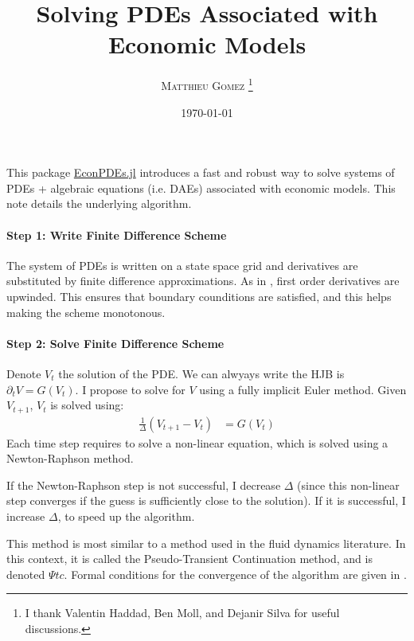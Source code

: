 \documentclass[english]{article}
\begin{document}
	\title{Solving PDEs Associated with Economic Models}
	\author{\large{\textsc{Matthieu Gomez \thanks{I thank Valentin Haddad, Ben Moll, and Dejanir Silva for useful discussions.}}}}
	\date{\today}
	\maketitle
	This package \href{https://github.com/matthieugomez/EconPDEs.jl}{EconPDEs.jl} introduces a fast and robust way to solve systems of PDEs + algebraic equations (i.e. DAEs) associated with economic models. This note details the underlying algorithm. 

	\paragraph{Step 1: Write Finite Difference Scheme}
	The system of PDEs is written on a state space grid and derivatives are substituted by finite difference approximations. As in \citet{achdou2014heterogeneous},  first order derivatives are upwinded. This ensures that boundary counditions are satisfied, and this helps making the scheme monotonous.

	\paragraph{Step 2: Solve Finite Difference Scheme}

	Denote $V_t$  the solution of the PDE. We can alwyays write the HJB is $\partial_t V =G(V_t)$. 
	I propose to solve for $V$ using a fully implicit Euler method.  Given $V_{t+1}$, $V_t$ is solved using:
	\begin{align*}
		 \frac{1}{\Delta}(V_{t+1} -V_{t})&= G(V_{t})
	\end{align*}
	Each time step requires to solve a non-linear equation, which is solved using a Newton-Raphson method. 

	If the Newton-Raphson step is not successful, I decrease $\Delta$ (since this non-linear step converges if the guess is sufficiently close to the solution). If it is successful, I increase $\Delta$, to speed up the algorithm.

	This method is most similar to a method used in the fluid dynamics literature. In this context, it is called the Pseudo-Transient Continuation method, and is denoted $\Psi tc$. Formal conditions for the convergence of the algorithm are given in  \citet{kelley1998convergence}.\par
\end{document}

